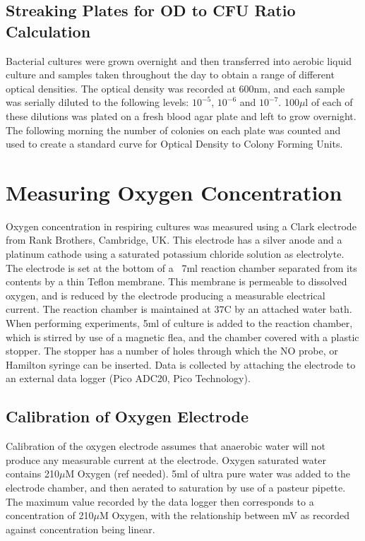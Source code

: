 \subsection{Streaking Plates for OD to CFU Ratio Calculation}
Bacterial cultures were grown overnight and then transferred into aerobic liquid culture and samples taken throughout the day to obtain a range of different optical densities. The optical density was recorded at 600nm, and each sample was serially diluted to the following levels: $10^{-5}$, $10^{-6}$ and $10^{-7}$. 100$\mu$l of each of these dilutions was plated on a fresh blood agar plate and left to grow overnight. The following morning the number of colonies on each plate was counted and used to create a standard curve for Optical Density to Colony Forming Units.

\section{Measuring Oxygen Concentration}
Oxygen concentration in respiring cultures was measured using a Clark electrode \cite{Clark1953} from Rank Brothers, Cambridge, UK. This electrode has a silver anode and a platinum cathode using a saturated potassium chloride solution as electrolyte. The electrode is set at the bottom of a ~7ml reaction chamber separated from its contents by a thin Teflon membrane. This membrane is permeable to dissolved oxygen, and is reduced by the electrode producing a measurable electrical current. The reaction chamber is maintained at $37$\textdegree C by an attached water bath.
When performing experiments, 5ml of culture is added to the reaction chamber, which is stirred by use of a magnetic flea, and the chamber covered with a plastic stopper. The stopper has a number of holes through which the NO probe, or Hamilton syringe can be inserted. Data is collected by attaching the electrode to an external data logger (Pico ADC20, Pico Technology).
\subsection{Calibration of Oxygen Electrode}
Calibration of the oxygen electrode assumes that anaerobic water will not produce any measurable current at the electrode. Oxygen saturated water contains 210$\mu$M Oxygen (ref needed). 5ml of ultra pure water was added to the electrode chamber, and then aerated to saturation by use of a pasteur pipette. The maximum value recorded by the data logger then corresponds to a concentration of 210$\mu$M Oxygen, with the relationship between mV as recorded against concentration being linear.

